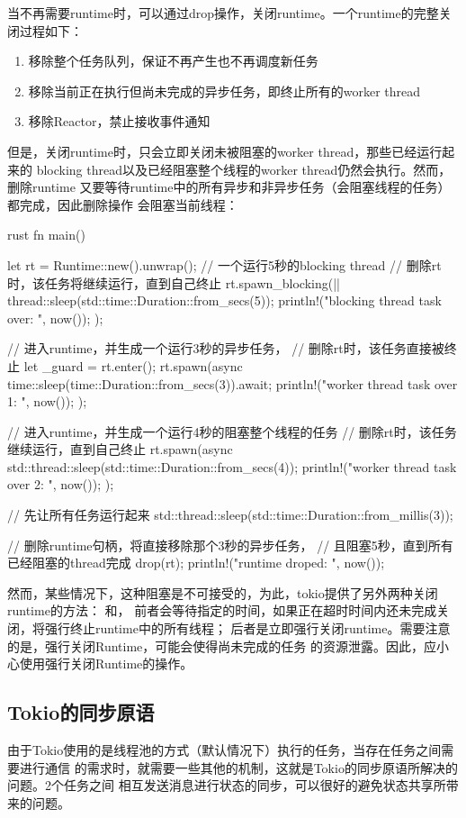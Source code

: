 当不再需要runtime时，可以通过drop操作，关闭runtime。一个runtime的完整关闭过程如下：
\begin{enumerate}
  \item 移除整个任务队列，保证不再产生也不再调度新任务
  \item 移除当前正在执行但尚未完成的异步任务，即终止所有的worker thread
  \item 移除Reactor，禁止接收事件通知
\end{enumerate}
但是，关闭runtime时，只会立即关闭未被阻塞的worker thread，那些已经运行起来的
blocking thread以及已经阻塞整个线程的worker thread仍然会执行。然而，删除runtime
又要等待runtime中的所有异步和非异步任务（会阻塞线程的任务）都完成，因此删除操作
会阻塞当前线程：
\begin{code-block}{rust}
fn main() {
    let rt = Runtime::new().unwrap();
    // 一个运行5秒的blocking thread
    // 删除rt时，该任务将继续运行，直到自己终止
    rt.spawn_blocking(|| {
      thread::sleep(std::time::Duration::from_secs(5));
      println!("blocking thread task over: {}", now());
    });

    // 进入runtime，并生成一个运行3秒的异步任务，
    // 删除rt时，该任务直接被终止
    let _guard = rt.enter();
    rt.spawn(async {
      time::sleep(time::Duration::from_secs(3)).await;
      println!("worker thread task over 1: {}", now());
    });

    // 进入runtime，并生成一个运行4秒的阻塞整个线程的任务
    // 删除rt时，该任务继续运行，直到自己终止
    rt.spawn(async {
      std::thread::sleep(std::time::Duration::from_secs(4));
      println!("worker thread task over 2: {}", now());
    });

    // 先让所有任务运行起来
    std::thread::sleep(std::time::Duration::from_millis(3));

    // 删除runtime句柄，将直接移除那个3秒的异步任务，
    // 且阻塞5秒，直到所有已经阻塞的thread完成
    drop(rt);
    println!("runtime droped: {}", now());
}
\end{code-block}

然而，某些情况下，这种阻塞是不可接受的，为此，tokio提供了另外两种关闭runtime的方法：
和，
前者会等待指定的时间，如果正在超时时间内还未完成关闭，将强行终止runtime中的所有线程；
后者是立即强行关闭runtime。需要注意的是，强行关闭Runtime，可能会使得尚未完成的任务
的资源泄露。因此，应小心使用强行关闭Runtime的操作。

\subsection{Tokio的同步原语}
由于Tokio使用的是线程池的方式（默认情况下）执行的任务，当存在任务之间需要进行通信
的需求时，就需要一些其他的机制，这就是Tokio的同步原语所解决的问题。2个任务之间
相互发送消息进行状态的同步，可以很好的避免状态共享所带来的问题。

